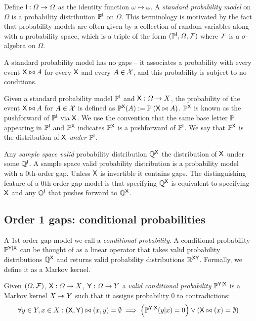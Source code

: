 Define $\mathsf{I}:\Omega\to \Omega$ as the identity function $\omega\mapsto \omega$. A \emph{standard probability model} on $\Omega$ is a probability distribution $\mathbb{P}^{\mathsf{I}}$ on $\Omega$. This terminology is motivated by the fact that probability models are often given by a collection of random variables along with a probability space, which is a triple of the form $(\mathbb{P}^{\mathsf{I}},\Omega,\mathcal{F})$ where $\mathcal{F}$ is a $\sigma$-algebra on $\Omega$.

A standard probability model has no gaps -- it associates a probability with every event $\mathsf{X}\bowtie A$ for every $\mathsf{X}$ and every $A\in\mathcal{X}$, and this probability is subject to no conditions.

Given a standard probability model $\mathbb{P}^{\mathsf{I}}$ and $\mathsf{X}:\Omega\to X$, the probability of the event $\mathsf{X}\bowtie A$ for $A\in\mathcal{X}$ is defined as $\mathbb{P}^{\mathsf{X}}(A):=\mathbb{P}^{\mathsf{I}}(\mathsf{X}\bowtie A)$. $\mathbb{P}^{\mathsf{X}}$ is known as the pushforward of $\mathbb{P}^{\mathsf{I}}$ via $\mathsf{X}$. We use the convention that the same base letter $\mathbb{P}$ appearing in $\mathbb{P}^{\mathsf{I}}$ and $\mathbb{P}^{\mathsf{X}}$ indicates $\mathbb{P}^{\mathsf{X}}$ is a pushforward of $\mathbb{P}^{\mathsf{I}}$. We say that $\mathbb{P}^{\mathsf{X}}$ is the distribution of $\mathsf{X}$ \emph{under} $\mathbb{P}^{\mathsf{I}}$.

Any \emph{sample space valid} probability distribution $\mathbb{Q}^{\mathsf{X}}$ the distribution of $\mathsf{X}$ under some $\mathbb{Q}^{\mathsf{I}}$. A sample space valid probability distribution is a probability model with a 0th-order gap. Unless $\mathsf{X}$ is invertible it contains gaps. The distinguishing feature of a 0th-order gap model is that specifying $\mathbb{Q}^{\mathsf{X}}$ is equivalent to specifying $\mathsf{X}$ and any $\mathbb{Q}^{\mathsf{I}}$ that pushes forward to $\mathbb{Q}^{\mathsf{X}}$.

\subsection{Order 1 gaps: conditional probabilities}\label{sec:validity_of_gapprob}

A 1st-order gap model we call a \emph{conditional probability}. A conditional probability $\mathbb{P}^{\mathsf{Y}|\mathsf{X}}$ can be thought of as a linear operator that takes valid probability distributions $\mathbb{Q}^{\mathsf{X}}$ and returns valid probability distributions $\mathbb{R}^{\mathsf{XY}}$. Formally, we define it as a Markov kernel.

\begin{definition}\label{def:valid_conditional_prob}
Given $(\Omega,\mathcal{F})$, $\mathsf{X}:\Omega\to X$, $\mathsf{Y}:\Omega\to Y$ a \emph{valid conditional probability} $\mathbb{P}^{\mathsf{Y}|\mathsf{X}}$ is a Markov kernel $X\rightarrowtriangle Y$ such that it assigns probability 0 to contradictions:
\begin{align}
	\forall y\in Y, x\in X: (\mathsf{X},\mathsf{Y})\bowtie(x,y) = \emptyset \implies \left(\mathbb{P}^{\mathsf{Y}|\mathsf{X}}(y|x) = 0\right) \lor \left(\mathsf{X}\bowtie (x) = \emptyset\right)
\end{align}
\end{definition}

